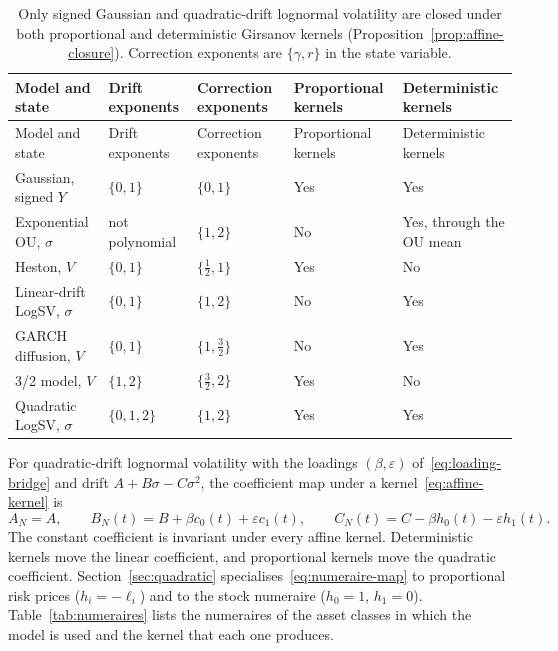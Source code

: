 \documentclass[11pt,a4paper]{article}
\theoremstyle{definition}
\theoremstyle{remark}
\begin{document}
{\small
\setlength{\tabcolsep}{4pt}
\renewcommand{\arraystretch}{1.2}
\begin{longtable}{@{}P{34mm}P{26mm}P{26mm}P{24mm}P{36mm}@{}}
\caption{Only signed Gaussian and quadratic-drift lognormal volatility are closed under both proportional and deterministic Girsanov kernels (Proposition~\ref{prop:affine-closure}). Correction exponents are \(\{\gamma,r\}\) in the state variable.}\label{tab:kernel-closure}\\
\toprule
Model and state & Drift exponents & Correction exponents & Proportional kernels & Deterministic kernels\\
\midrule
\endfirsthead
\toprule Model and state & Drift exponents & Correction exponents & Proportional kernels & Deterministic kernels\\ \midrule
\endhead
\bottomrule
\endfoot
Gaussian, signed \(Y\) & \(\{0,1\}\) & \(\{0,1\}\) & Yes & Yes\\
Exponential OU, \(\sigma\) & not polynomial & \(\{1,2\}\) & No & Yes, through the OU mean\\
Heston, \(V\) & \(\{0,1\}\) & \(\{\tfrac12,1\}\) & Yes & No\\
Linear-drift LogSV, \(\sigma\) & \(\{0,1\}\) & \(\{1,2\}\) & No & Yes\\
GARCH diffusion, \(V\) & \(\{0,1\}\) & \(\{1,\tfrac32\}\) & No & Yes\\
3/2 model, \(V\) & \(\{1,2\}\) & \(\{\tfrac32,2\}\) & Yes & No\\
Quadratic LogSV, \(\sigma\) & \(\{0,1,2\}\) & \(\{1,2\}\) & Yes & Yes\\
\end{longtable}
}

For quadratic-drift lognormal volatility with the loadings \((\beta,\varepsilon)\) of~\eqref{eq:loading-bridge} and drift \(A+B\sigma-C\sigma^2\), the coefficient map under a kernel~\eqref{eq:affine-kernel} is
\begin{equation}
 A_N=A,\qquad
 B_N(t)=B+\beta c_0(t)+\varepsilon c_1(t),\qquad
 C_N(t)=C-\beta h_0(t)-\varepsilon h_1(t).
 \label{eq:numeraire-map}
\end{equation}
The constant coefficient is invariant under every affine kernel. Deterministic kernels move the linear coefficient, and proportional kernels move the quadratic coefficient. Section~\ref{sec:quadratic} specialises~\eqref{eq:numeraire-map} to proportional risk prices (\(h_i=-\ell_i\)) and to the stock numeraire (\(h_0=1\), \(h_1=0\)). Table~\ref{tab:numeraires} lists the numeraires of the asset classes in which the model is used and the kernel that each one produces.
\end{document}
